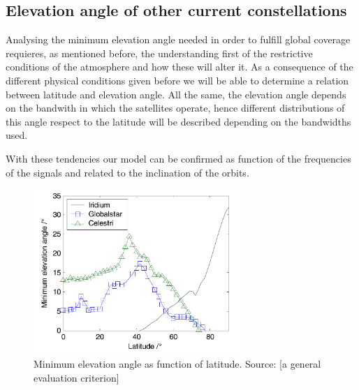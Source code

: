 \subsection{Elevation angle of other current constellations}

Analysing the minimum elevation angle needed in order to fulfill global coverage requieres, as mentioned before, the understanding first of the restrictive conditions of the atmosphere and how these will alter it. As a consequence of the different physical conditions given before we will be able to determine a relation between latitude and elevation angle. All the same, the elevation angle depends on the bandwith in which the satellites operate, hence different distributions of this angle respect to the latitude will be described depending on the bandwidths used. 


With these tendencies our model can be confirmed as function of the frequencies of the signals and related to the inclination of the orbits. 

\begin{figure}[H]
\includegraphics[width=8cm]{latitudes}
\centering
\caption[Minimum elevation angle as function of latitude]{Minimum elevation angle as function of latitude. Source: [a general evaluation criterion]}
\end{figure}